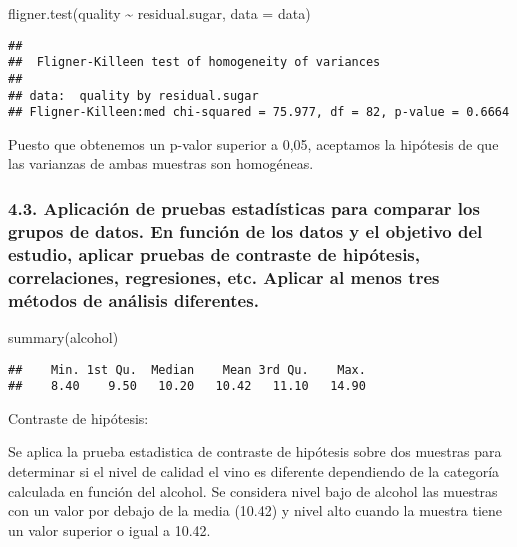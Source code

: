 \documentclass[
]{article}
\newenvironment{Shaded}{\begin{snugshade}}{\end{snugshade}}
\newcommand{\AttributeTok}[1]{\textcolor[rgb]{0.77,0.63,0.00}{#1}}
\newcommand{\FunctionTok}[1]{\textcolor[rgb]{0.00,0.00,0.00}{#1}}
\newcommand{\NormalTok}[1]{#1}
\newcommand{\SpecialCharTok}[1]{\textcolor[rgb]{0.00,0.00,0.00}{#1}}
\begin{document}
\begin{Shaded}
\begin{Highlighting}[]
\FunctionTok{fligner.test}\NormalTok{(quality }\SpecialCharTok{\textasciitilde{}}\NormalTok{ residual.sugar, }\AttributeTok{data =}\NormalTok{ data)}
\end{Highlighting}
\end{Shaded}

\begin{verbatim}
## 
##  Fligner-Killeen test of homogeneity of variances
## 
## data:  quality by residual.sugar
## Fligner-Killeen:med chi-squared = 75.977, df = 82, p-value = 0.6664
\end{verbatim}

Puesto que obtenemos un p-valor superior a 0,05, aceptamos la hipótesis
de que las varianzas de ambas muestras son homogéneas.

\hypertarget{aplicaciuxf3n-de-pruebas-estaduxedsticas-para-comparar-los-grupos-de-datos.-en-funciuxf3n-de-los-datos-y-el-objetivo-del-estudio-aplicar-pruebas-de-contraste-de-hipuxf3tesis-correlaciones-regresiones-etc.-aplicar-al-menos-tres-muxe9todos-de-anuxe1lisis-diferentes.}{%
\subsubsection{4.3. Aplicación de pruebas estadísticas para comparar los
grupos de datos. En función de los datos y el objetivo del estudio,
aplicar pruebas de contraste de hipótesis, correlaciones, regresiones,
etc. Aplicar al menos tres métodos de análisis
diferentes.}\label{aplicaciuxf3n-de-pruebas-estaduxedsticas-para-comparar-los-grupos-de-datos.-en-funciuxf3n-de-los-datos-y-el-objetivo-del-estudio-aplicar-pruebas-de-contraste-de-hipuxf3tesis-correlaciones-regresiones-etc.-aplicar-al-menos-tres-muxe9todos-de-anuxe1lisis-diferentes.}}

\begin{Shaded}
\begin{Highlighting}[]
\FunctionTok{summary}\NormalTok{(alcohol)}
\end{Highlighting}
\end{Shaded}

\begin{verbatim}
##    Min. 1st Qu.  Median    Mean 3rd Qu.    Max. 
##    8.40    9.50   10.20   10.42   11.10   14.90
\end{verbatim}

Contraste de hipótesis:

Se aplica la prueba estadistica de contraste de hipótesis sobre dos
muestras para determinar si el nivel de calidad el vino es diferente
dependiendo de la categoría calculada en función del alcohol. Se
considera nivel bajo de alcohol las muestras con un valor por debajo de
la media (10.42) y nivel alto cuando la muestra tiene un valor superior
o igual a 10.42.
\end{document}
